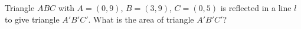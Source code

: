 Triangle $ABC$ with $A=(0,9)$, $B=(3,9)$, $C=(0,5)$ is reflected in a line $l$ to give triangle $A'B'C'$. What is the area of triangle $A'B'C'$?
